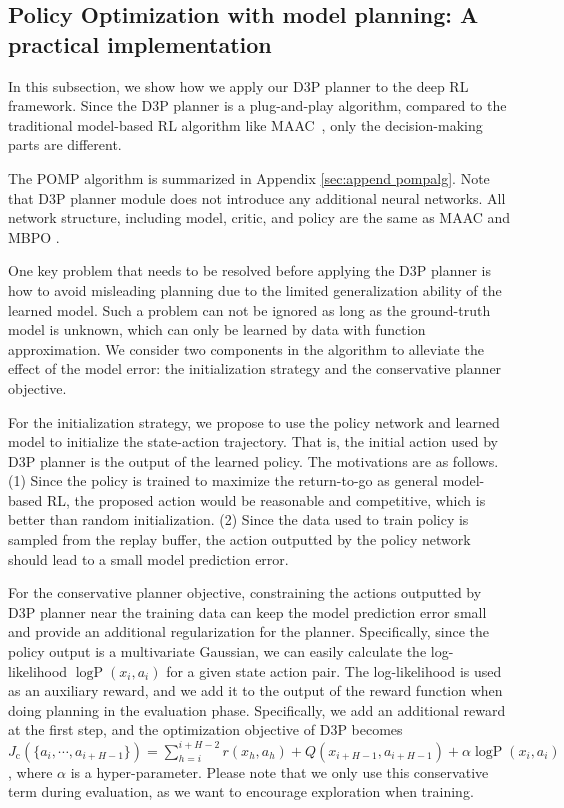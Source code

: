 \documentclass{article}
\newcommand{\yue}[1]{ {#1}}
\begin{document}
\subsection{Policy Optimization with model planning: A practical implementation }

In this subsection, we show how we apply our D3P planner to the deep RL framework. 
Since the D3P planner is a plug-and-play algorithm, compared to the traditional model-based RL algorithm like MAAC~, only the  decision-making parts are different. 

The  POMP algorithm  is summarized in Appendix \ref{sec:append pompalg}.  Note that D3P planner module does not introduce any additional neural networks. 
\yue{All network structure, including model, critic, and policy are the same as MAAC  and MBPO .}

One key problem that needs to be resolved before applying the D3P planner is how to avoid  misleading planning due to the limited generalization ability of the learned model. Such a problem can not be ignored  as long as the ground-truth model is unknown, which can only be learned by data with function approximation. We consider two components in the algorithm to alleviate the effect of the model error: the initialization strategy and the conservative planner objective.  

For the initialization strategy,  we propose to use the policy network and learned model to initialize the state-action trajectory. 
\yue{That is, the initial action used by  D3P planner is the output of the learned policy. The motivations are as follows. (1) Since the policy is trained to maximize the return-to-go as general model-based RL, the proposed action would be reasonable and competitive, which is better than random initialization. (2) Since the data used to train policy is sampled from the replay buffer, the action outputted by the policy network should lead to a small model prediction error.}

 
For the conservative planner objective, constraining the actions outputted by D3P planner  near the training data can keep the model prediction error small and provide an additional regularization for the planner. Specifically, 
since the policy output is a multivariate Gaussian, we can easily calculate  the log-likelihood $\operatorname{logP}({x}_i, {a}_i)$ for a given state action pair. 
\yue{The log-likelihood is used as an auxiliary reward, and we add it to the output of the reward function when doing planning in the evaluation phase. }
Specifically, we add an additional reward at the first step, and the optimization objective of D3P becomes
$J_{\text{c}}(\{a_i,\cdots, a_{i+H-1}\})=\sum_{h=i}^{i+H-2}r({x}_h, {a}_h)+Q({x}_{i+H-1}, {a}_{i+H-1}) + \alpha \operatorname{logP}({x}_i, {a}_i)$, where $\alpha$ is 
a hyper-parameter. 
Please note that we only use this conservative term during evaluation, as we want to encourage exploration when training.
 
\end{document}
